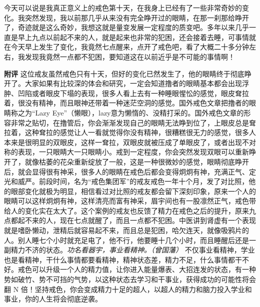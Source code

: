 \begin{case}
    今天可以说是我真正意义上的戒色第十天，在我身上已经有了一些非常奇妙的变化。我突然发现，我以前那几乎从来没有完全睁开过的眼睛，在那一刹那给睁开了，奇迹就是这么奇妙，我想这就是量变发展一定程度的质变吧。多年以来几乎一直是早上九点以前起不来的人，就是起来也非常的犯困，还会接着去睡，可事情就在今天早上发生了变化，我竟然七点醒来，点开了戒色吧，看了大概二十多分钟左右，我发现我竟然一点都不犯困，要知道这在以前近乎是不可能的事情啊！

    \textbf{附评} 这位戒友虽然戒色只有十天，但好的变化已然发生了，他的眼睛终于彻底睁开了。大家如果有比较深的体会和研究，一定会知道撸者的眼睛基本都会出现浮肿、凹陷或者眼皮下塌的表现，很多人看上去有一种睡眼惺忪的感觉，眼皮耷拉着，很没有精神，而且眼神还带着一种迷茫空洞的感觉。国外戒色文章把撸者的眼睛称之为“Lazy Eye”（懒眼），lazy意为懒惰的、没精打采的。国外戒色文章的形容非常之贴切，在撸管后，你会渐渐发现自己的眼睛无法睁到位了，上眼皮总是耷拉着，这种耷拉的感觉让人一看就觉得你没有精神，很糟糕很无力的感觉，很多人本来是很明显的双眼皮，这样一耷拉，双眼皮就被压成了单眼皮了，或者出现不对称的表现，一只眼睛大一只眼睛小。戒到一定程度，你会突然发现双眼可以重新睁开了，就像枯萎的花朵重新绽放了一般，这是一种很微妙的感觉，眼睛彻底睁开后，就会显得很有神采，很多人的眼睛在戒色后都会变得炯炯有神，充满正气、定光和威严。前段时间，名为“戒色集团军”的戒友戒色一年十个月，发了对比照，他的眼部变化就极为明显，相信看过对比照的戒友都会留下深刻印象，原来一个人的眼睛可以这样炯炯有神，这样清亮而富有神采，眉宇间也有一股凛然正气，戒色带给人的变化实在太大了。这个案例的戒友也反馈了精力在戒色之后的提升，原来九点都起不来的人，现在七点就醒了，而且一点都不犯困。中医讲到肾虚有一个表现就是嗜卧懒动，泄精后就容易起不来，而且总是犯困，哈欠连天，就像吸鸦片的人。别人睡七个小时就充足电了，他不行，他要睡十几个小时，而且睡醒后还是一副精力不济的状态。\textit{功名看器宇，事业看精神。（曾国藩）} 不仅事业看精神，学业也是看精神，干什么事情都要看精神，精神状态差，精力不足，什么事情都干不好。戒色可以升级一个人的精力值，让你进入能量爆表、大招连发的状态，有一种势如破竹、势不可挡的气势，以这种状态去学习和干事业，获得成功的可能性将会翻 N 倍！坚持戒色，你会变成精力十足的超人，以超人的精力和脑力投入学业和事业，你的人生将会彻底逆袭。
\end{case}

